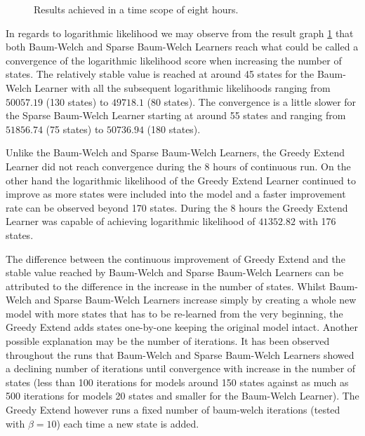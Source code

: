 \begin{figure}
	\centering
	\caption{Results achieved in a time scope of eight hours.}
	\label{fig:eight_hour_run}
\end{figure}

In regards to logarithmic likelihood we may observe from the result graph \ref{fig:eight_hour_run} that both Baum-Welch and Sparse Baum-Welch Learners reach what could be called a convergence of the logarithmic likelihood score when increasing the number of states. The relatively stable value is reached at around 45 states for the Baum-Welch Learner with all the subsequent logarithmic likelihoods ranging from $50057.19$ (130 states) to $49718.1$ (80 states). The convergence is a little slower for the Sparse Baum-Welch Learner starting at around 55 states and ranging from $51856.74$ (75 states) to $50736.94$ (180 states).

Unlike the Baum-Welch and Sparse Baum-Welch Learners, the Greedy Extend Learner did not reach convergence during the 8 hours of continuous run. On the other hand the logarithmic likelihood of the Greedy Extend Learner continued to improve as more states were included into the model and a faster improvement rate can be observed beyond 170 states. During the 8 hours the Greedy Extend Learner was capable of achieving logarithmic likelihood of $41352.82$ with 176 states.

The difference between the continuous improvement of Greedy Extend and the stable value reached by Baum-Welch and Sparse Baum-Welch Learners can be attributed to the difference in the increase in the number of states. Whilst Baum-Welch and Sparse Baum-Welch Learners increase simply by creating a whole new model with more states that has to be re-learned from the very beginning, the Greedy Extend adds states one-by-one keeping the original model intact. Another possible explanation may be the number of iterations. It has been observed throughout the runs that Baum-Welch and Sparse Baum-Welch Learners showed a declining number of iterations until convergence with increase in the number of states (less than 100 iterations for models around 150 states against as much as 500 iterations for models 20 states and smaller for the Baum-Welch Learner). The Greedy Extend however runs a fixed number of \gls{baum-welch} iterations (tested with $\beta = 10$) each time a new state is added.

